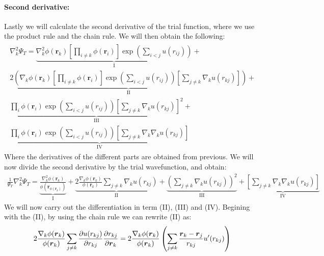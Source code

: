 \documentclass[a4paper, 10pt]{article}
\begin{document}
\begin{appendices}
		\paragraph{Second derivative:}
		Lastly we will calculate the second derivative of the trial function, where we
		use the product rule and the chain rule. We will then obtain the following:
		\begin{align*}
		\begin{split}
		\nabla_{k}^2\Psi_{T} =
		\underbrace{\nabla_k^2 \phi(\mathbf{r}_k)\left[ \prod_{i\neq k} \phi(\mathbf{r}_i)\right]\exp\left(\sum_{i<j}u(r_{ij})\right)}_{\mathrm{I}} +\\
		\underbrace{2\left(\nabla_k \phi(\mathbf{r}_k)\left[ \prod_{i\neq k} \phi(\mathbf{r}_i)\right]
			\exp{\left(\sum_{i<j}u(r_{ij})\right)}
			\left[\sum_{j \neq k}\nabla_{k}u(r_{kj})\right]\right)}_{\mathrm{II}} +
		\\
		\underbrace{\prod_{i}\phi(\boldsymbol{r}_{i})
			\exp{\left(\sum_{i<j}u(r_{ij})\right)}
			\left[\sum_{j \neq k}\nabla_{k}u(r_{kj})\right]^2}_{\mathrm{III}} +
		\\
		\underbrace{\prod_{i}\phi(\boldsymbol{r}_{i})
			\exp{\left(\sum_{i<j}u(r_{ij})\right)}
			\left[\sum_{j \neq k}\nabla_{k}\nabla_{k}u(r_{kj})\right]}_{\mathrm{IV}}
		\end{split}
		\end{align*}
		Where the derivatives of the different parts are obtained from previous.
		We will now divide the second derivative by the trial wavefunction, and obtain:
		\begin{align}
		\frac{1}{\Psi_{T}}\nabla_{k}^2\Psi_{T} =
		\underbrace{\frac{\nabla_{k}^2\phi{(\boldsymbol{r}_{k})}}{\phi(\boldsymbol{r}_{\phi(\boldsymbol{r}_{k})})}}_{\mathrm{I}}
		+ \underbrace{2\frac{\nabla_{k}\phi(\boldsymbol{r}_{k})}{\phi{(\boldsymbol{r}_{k})}}\sum_{j\neq k}\nabla_{k}u(r_{kj})}_{\mathrm{II}}
		+ \underbrace{\left(\sum_{j\neq k}\nabla_{k} u(r_{kj})\right)^2}_{\mathrm{III}} +
		\underbrace{\left[\sum_{j \neq k}\nabla_{k}\nabla_{k}u(r_{kj})\right]}_{\mathrm{IV}}
		\end{align}
		We will now carry out the differentiation in term (II), (III) and (IV). Begining with the
		(II), by using the chain rule we can rewrite (II) as:
		\begin{align*}
		2\frac{\nabla_{k}\phi(\boldsymbol{r}_{k})}{\phi{(\boldsymbol{r}_{k})}}\sum_{j\neq k}\pdv{u(r_{kj})}{r_{kj}}\pdv{r_{kj}}{\boldsymbol{r}_{k}} =
		2\frac{\nabla_{k}\phi(\boldsymbol{r}_{k})}{\phi{(\boldsymbol{r}_{k})}}\left(\sum_{j\neq k}\frac{\boldsymbol{r}_{k} - \boldsymbol{r}_{j}}{r_{kj}}u'(r_{kj})\right)

\end{align*}
\end{appendices}
\end{document}
